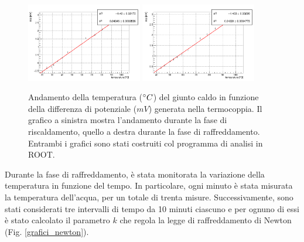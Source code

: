 \documentclass{article}
\begin{document}
\begin{figure}[h!] %
\centering
\includegraphics[width=0.45\textwidth]{tc_salita_root}
\hspace{20pt}
\includegraphics[width=0.45\textwidth]{tc_discesa_root}
\caption{Andamento della temperatura ($\degree C$) del giunto caldo in funzione della differenza di potenziale ($mV$) generata nella termocoppia. Il grafico a sinistra mostra l'andamento durante la fase di riscaldamento, quello a destra durante la fase di raffreddamento. Entrambi i grafici sono stati costruiti col programma di analisi in ROOT.}
\label{grafici_termocoppia}
\end{figure}

Durante la fase di raffreddamento, è stata monitorata la variazione della temperatura in funzione del tempo. In particolare, ogni minuto è stata misurata la temperatura dell'acqua, per un totale di trenta misure. Successivamente, sono stati considerati tre intervalli di tempo da 10 minuti ciascuno e per ognuno di essi è stato calcolato il parametro $k$ che regola la legge di raffreddamento di Newton (Fig. \ref{grafici_newton}).
\end{document}
